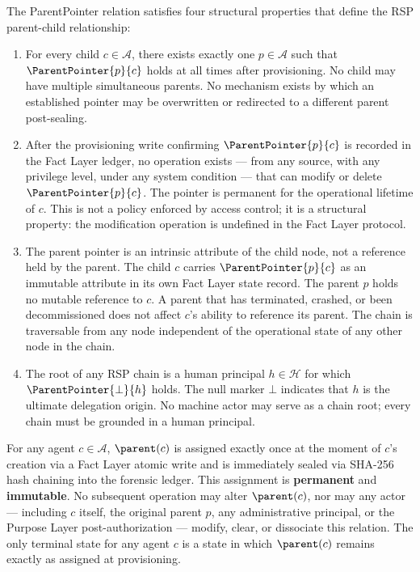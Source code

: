 The ParentPointer relation satisfies four structural properties that define the RSP parent-child relationship:

\begin{enumerate}
    \item[(P1) \textbf{Uniqueness}] For every child $c \in \mathcal{A}$, there exists exactly one $p \in \mathcal{A}$ such that $\ParentPointer{p}{c}$ holds at all times after provisioning. No child may have multiple simultaneous parents. No mechanism exists by which an established pointer may be overwritten or redirected to a different parent post-sealing.

    \item[(P2) \textbf{Immutability}] After the provisioning write confirming $\ParentPointer{p}{c}$ is recorded in the Fact Layer ledger, no operation exists — from any source, with any privilege level, under any system condition — that can modify or delete $\ParentPointer{p}{c}$. The pointer is permanent for the operational lifetime of $c$. This is not a policy enforced by access control; it is a structural property: the modification operation is undefined in the Fact Layer protocol.

    \item[(P3) \textbf{Directionality}] The parent pointer is an intrinsic attribute of the child node, not a reference held by the parent. The child $c$ carries $\ParentPointer{p}{c}$ as an immutable attribute in its own Fact Layer state record. The parent $p$ holds no mutable reference to $c$. A parent that has terminated, crashed, or been decommissioned does not affect $c$'s ability to reference its parent. The chain is traversable from any node independent of the operational state of any other node in the chain.

    \item[(P4) \textbf{Human Anchor Termination}] The root of any RSP chain is a human principal $h \in \mathcal{H}$ for which $\ParentPointer{\bot}{h}$ holds. The null marker $\bot$ indicates that $h$ is the ultimate delegation origin. No machine actor may serve as a chain root; every chain must be grounded in a human principal.
\end{enumerate}

\begin{invariant}
\label{inv:pp_immutability}
For any agent $c \in \mathcal{A}$, $\parent(c)$ is assigned exactly once at the moment of $c$'s creation via a Fact Layer atomic write and is immediately sealed via SHA-256 hash chaining into the forensic ledger. This assignment is \textbf{permanent} and \textbf{immutable}. No subsequent operation may alter $\parent(c)$, nor may any actor — including $c$ itself, the original parent $p$, any administrative principal, or the Purpose Layer post-authorization — modify, clear, or dissociate this relation. The only terminal state for any agent $c$ is a state in which $\parent(c)$ remains exactly as assigned at provisioning.
\end{invariant}

